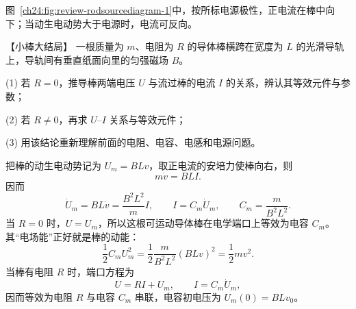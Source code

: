 {\begin{xesolution}
图~\ref{ch24:fig:review-rodsourcediagram-1}中，按所标电源极性，正电流在棒中向下；当动生电动势大于电源时，电流可反向。
\par\noindent\begin{minipage}{\linewidth}
\rodSourceDiagram
{}
\end{minipage}\par\medskip
\end{xesolution}



\begin{origexamplebox}{【小棒大结局】}\label{ch24:ex:s40-9-9}
一根质量为 $m$、电阻为 $R$ 的导体棒横跨在宽度为 $L$ 的光滑导轨上，导轨间有垂直纸面向里的匀强磁场 $B$。

(1) 若 $R=0$，推导棒两端电压 $U$ 与流过棒的电流 $I$ 的关系，辨认其等效元件与参数；

(2) 若 $R\ne0$，再求 $U$--$I$ 关系与等效元件；

(3) 用该结论重新理解前面的电阻、电容、电感和电源问题。

\begin{center}\end{center}
\end{origexamplebox}

\begin{xesolution}
把棒的动生电动势记为 $U_m=BLv$，取正电流的安培力使棒向右，则
\begin{equation}
  m\dot v=BLI.
\end{equation}
因而
\begin{equation}
  \dot U_m=BL\dot v=\frac{B^2L^2}{m}I,
  \qquad
  \boxed{I=C_m\dot U_m},
  \qquad
  \boxed{C_m=\frac{m}{B^2L^2}}.
\end{equation}
当 $R=0$ 时，$U=U_m$，所以这根可运动导体棒在电学端口上等效为电容 $C_m$。其“电场能”正好就是棒的动能：
\begin{equation}
  \frac12C_mU_m^2=\frac12\frac{m}{B^2L^2}(BLv)^2=\frac12mv^2.
\end{equation}
当棒有电阻 $R$ 时，端口方程为
\begin{equation}
  \boxed{U=RI+U_m},
  \qquad I=C_m\dot U_m,
\end{equation}
因而等效为电阻 $R$ 与电容 $C_m$ 串联，电容初电压为 $U_m(0)=BLv_0$。


\end{xesolution}}
